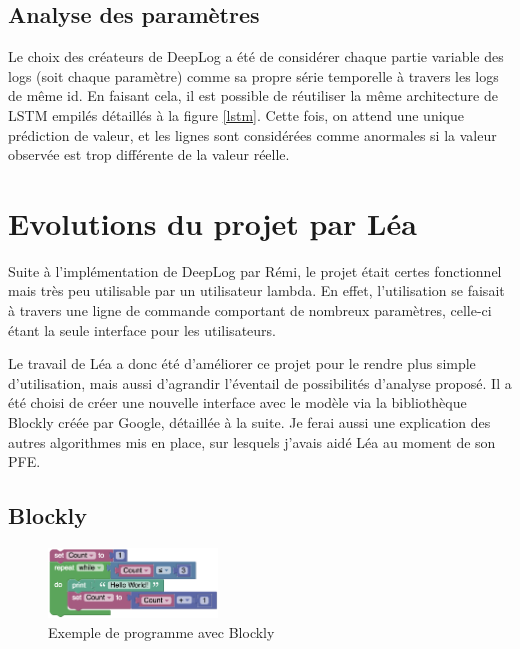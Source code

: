 \documentclass[openany, 11pt]{memoir}
\begin{document}
\subsection{Analyse des paramètres}

Le choix des créateurs de DeepLog a été de considérer chaque partie variable des \glspl{log} (soit chaque paramètre) comme sa propre série temporelle à travers les logs de même id. En faisant cela, il est possible de réutiliser la même architecture de \gls{LSTM} empilés détaillés à la figure \ref{lstm}. Cette fois, on attend une unique prédiction de valeur, et les lignes sont considérées comme anormales si la valeur observée est trop différente de la valeur réelle.

\section{Evolutions du projet par Léa}

Suite à l'implémentation de DeepLog par Rémi, le projet était certes fonctionnel mais très peu utilisable par un utilisateur lambda. En effet, l'utilisation se faisait à travers une ligne de commande comportant de nombreux paramètres, celle-ci étant la seule interface pour les utilisateurs.

Le travail de Léa a donc été d'améliorer ce projet pour le rendre plus simple d'utilisation, mais aussi d'agrandir l'éventail de possibilités d'analyse proposé. Il a été choisi de créer une nouvelle interface avec le modèle via la bibliothèque Blockly créée par Google, détaillée à la suite. Je ferai aussi une explication des autres algorithmes mis en place, sur lesquels j'avais aidé Léa au moment de son PFE.

\subsection{Blockly}

\begin{figure}[ht]
	\centering
	\includegraphics[width=0.4\textwidth]{images/blockly.png}
	\caption{Exemple de programme avec Blockly}
	\label{blockly}
\end{figure}

\end{document}
